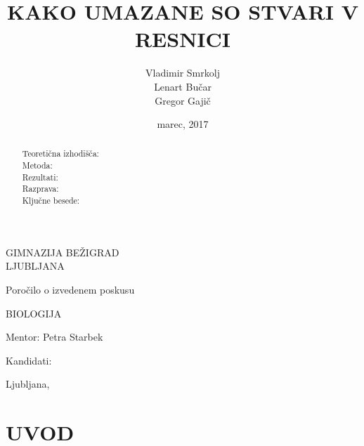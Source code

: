 \documentclass[12pt, a4paper, oneside]{report}
\begin{document}
\title{KAKO UMAZANE SO STVARI V RESNICI}
\author{Vladimir Smrkolj\\Lenart Bučar\\Gregor Gajič}
\date{marec, 2017}

\sffamily

\begin{titlepage}
\centering


{\Large{GIMNAZIJA BEŽIGRAD\\[2mm]LJUBLJANA}}

\vspace{3.5cm}

{\large Poročilo o izvedenem poskusu

\vspace{1cm}

BIOLOGIJA
}

\vspace{3.5cm}

\makeatletter
{\LARGE{\textbf{\@title}}}
\makeatother


\vfill


\parbox{4cm}{Mentor: Petra Starbek}
\hfill
\makeatletter
Kandidati: \parbox[t]{3cm}{\@author}
\makeatother

\vspace{3cm}

\makeatletter
Ljubljana, \@date
\makeatother

\end{titlepage}


\tableofcontents

\begin{abstract}
\begin{description}

\item[Teoretična izhodišča:]

\item[Metoda:]

\item[Rezultati:]

\item[Razprava:]

\item[Ključne besede:]

\end{description}
\end{abstract}


\pagestyle{fancy}
\chead{}


\chapter{UVOD}
\end{document}
